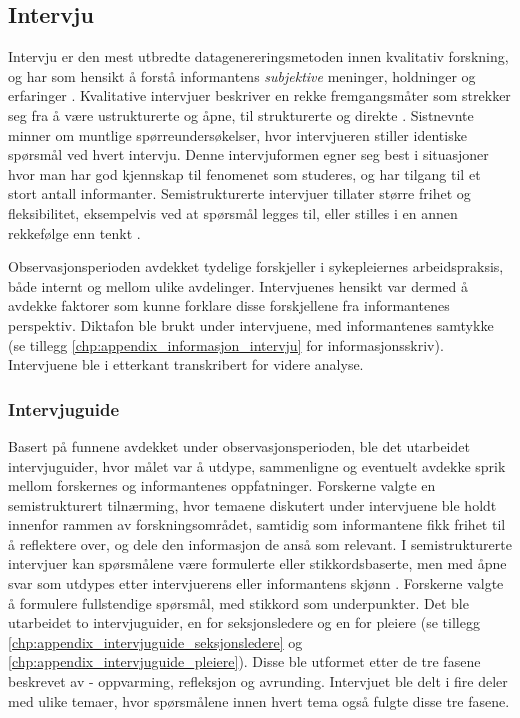 \subsection{Intervju}
\label{sec:intervju}
 
Intervju er den mest utbredte datagenereringsmetoden innen kvalitativ forskning, og har som hensikt å forstå informantens \textit{subjektive} meninger, holdninger og erfaringer \citep{Tjora}. Kvalitative intervjuer beskriver en rekke fremgangsmåter som strekker seg fra å være ustrukturerte og åpne, til strukturerte og direkte \citep{Smith12}. Sistnevnte minner om muntlige spørreundersøkelser, hvor intervjueren stiller identiske spørsmål ved hvert intervju. Denne intervjuformen egner seg best i situasjoner hvor man har god kjennskap til fenomenet som studeres, og har tilgang til et stort antall informanter. Semistrukturerte intervjuer tillater større frihet og fleksibilitet, eksempelvis ved at spørsmål legges til, eller stilles i en annen rekkefølge enn tenkt \citep{Tjora}.
 
\noindent
Observasjonsperioden avdekket tydelige forskjeller i sykepleiernes arbeidspraksis, både internt og mellom ulike avdelinger. Intervjuenes hensikt var dermed å avdekke faktorer som kunne forklare disse forskjellene fra informantenes perspektiv. Diktafon ble brukt under intervjuene, med informantenes samtykke (se tillegg \ref{chp:appendix_informasjon_intervju} for informasjonsskriv). Intervjuene ble i etterkant transkribert for videre analyse.
 
\subsubsection{Intervjuguide}
Basert på funnene avdekket under observasjonsperioden, ble det utarbeidet intervjuguider, hvor målet var å utdype, sammenligne og eventuelt avdekke sprik mellom forskernes og informantenes oppfatninger. Forskerne valgte en semistrukturert tilnærming, hvor temaene diskutert under intervjuene ble holdt innenfor rammen av forskningsområdet, samtidig som informantene fikk frihet til å reflektere over, og dele den informasjon de anså som relevant.
I semistrukturerte intervjuer kan spørsmålene være formulerte eller stikkordsbaserte, men med åpne svar som utdypes etter intervjuerens eller informantens skjønn \citep{Schensul99}. Forskerne valgte å formulere fullstendige spørsmål, med stikkord som underpunkter. Det ble utarbeidet to intervjuguider, en for seksjonsledere og en for pleiere (se tillegg \ref{chp:appendix_intervjuguide_seksjonsledere} og \ref{chp:appendix_intervjuguide_pleiere}). Disse ble utformet etter de tre fasene beskrevet av \citet{Tjora} - oppvarming, refleksjon og avrunding. Intervjuet ble delt i fire deler med ulike temaer, hvor spørsmålene innen hvert tema også fulgte disse tre fasene.
 
